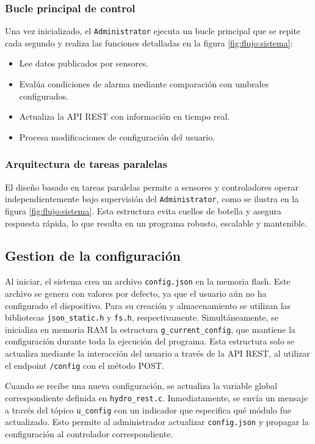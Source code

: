 \subsubsection*{Bucle principal de control}
Una vez inicializado, el \texttt{Administrator} ejecuta un bucle principal que se repite cada segundo y realiza las funciones detalladas en la figura \ref{fig:flujo:sistema}:


\begin{itemize}
    \item Lee datos publicados por sensores.
    \item Evalúa condiciones de alarma mediante comparación con umbrales configurados.
    \item Actualiza la API REST con información en tiempo real.
    \item Procesa modificaciones de configuración del usuario.
\end{itemize}

\subsubsection*{Arquitectura de tareas paralelas}
El diseño basado en tareas paralelas permite a sensores y controladores operar independientemente bajo supervisión del \texttt{Administrator}, como se ilustra en la figura \ref{fig:flujo:sistema}. Esta estructura evita cuellos de botella y asegura respuesta rápida, lo que resulta en un programa robusto, escalable y mantenible.



\subsection{Gestion de la configuración}
Al iniciar, el sistema crea un archivo \texttt{config.json} en la memoria flash. Este archivo se genera con valores por defecto, ya que el usuario aún no ha configurado el dispositivo. Para su creación y almacenamiento se utilizan las bibliotecas \texttt{json\_static.h} y \texttt{fs.h}, respectivamente. Simultáneamente, se inicializa en memoria RAM la estructura \texttt{g\_current\_config}, que mantiene la configuración durante toda la ejecución del programa. Esta estructura solo se actualiza mediante la interacción del usuario a través de la API REST, al utilizar el endpoint \texttt{/config} con el método POST.

Cuando se recibe una nueva configuración, se actualiza la variable global correspondiente definida en \texttt{hydro\_rest.c}. Inmediatamente, se envía un mensaje a través del tópico \texttt{u\_config} con un indicador que especifica qué módulo fue actualizado. Esto permite al administrador actualizar \texttt{config.json} y propagar la configuración al controlador correspondiente.


